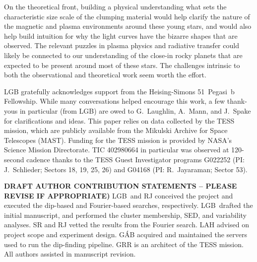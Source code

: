\documentclass[11pt,twocolumn,tighten]{aastex63}
\begin{document}
On the theoretical front,
building a physical understanding what sets the characteristic size
scale of the clumping material would help clarify the nature of
the magnetic and plasma environments around these young stars, 
and would also help build intuition for why the light curves have the
bizarre shapes that are observed.
The relevant puzzles in plasma physics and radiative transfer could
likely be connected to our understanding of the close-in rocky planets
that are expected to be present around most of these stars.
The challenges intrinsic to both the observational and theoretical
work seem worth the effort.



\acknowledgments
LGB gratefully acknowledges support from the
Heising-Simons 51~Pegasi~b Fellowship.
While many conversations helped encourage this work,
a few thank-yous in particular (from LGB) 
are owed to G.~Laughlin, A.~Mann, and J.~Spake for clarifications and ideas.
This paper relies on data collected by the TESS mission, which are publicly available from the Mikulski Archive for Space Telescopes (MAST). Funding for the TESS mission is provided by NASA’s Science Mission Directorate.
TIC 402980664 in particular was observed at 120-second cadence thanks to the TESS Guest
Investigator programs G022252 (PI: J.~Schlieder; Sectors 18, 19, 25,
26) and G04168 (PI: R.~Jayaraman; Sector 53).


{\bf DRAFT AUTHOR CONTRIBUTION STATEMENTS -- PLEASE REVISE IF 
	APPROPRIATE)}
LGB~and RJ conceived the project and executed the
dip-based and Fourier-based searches, respectively.
LGB~drafted the initial manuscript, and performed the cluster
membership, SED, and variability analyses.
SR and RJ vetted the results from the Fourier search.
LAH advised on project scope and experiment design.
G\'AB acquired and maintained the servers used to run the dip-finding
pipeline.
GRR is an architect of the TESS mission.
All authors assisted in manuscript revision.

\end{document}
